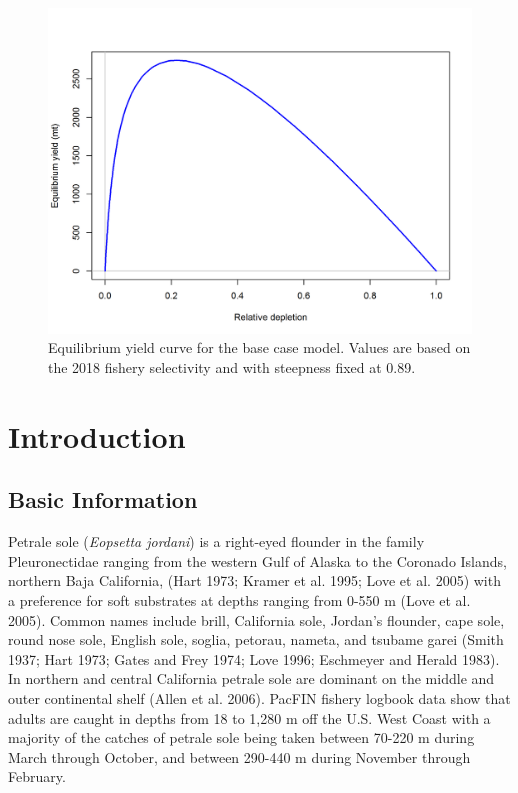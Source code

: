 \documentclass[12pt,]{article}
\begin{document}
\FloatBarrier

\begin{figure}
\centering
\includegraphics{r4ss/plots_mod1/yield1_yield_curve.png}
\caption{Equilibrium yield curve for the base case model. Values are
based on the 2018 fishery selectivity and with steepness fixed at 0.89.
\label{fig:Yield_all}}
\end{figure}

\FloatBarrier

\newpage

\renewcommand{\thefigure}{\arabic{figure}}
\renewcommand{\thetable}{\arabic{table}}

\setcounter{figure}{0} \setcounter{table}{0}


\section{Introduction}\label{introduction}

\subsection{Basic Information}\label{basic-information}

Petrale sole (\emph{Eopsetta jordani}) is a right-eyed flounder in the
family Pleuronectidae ranging from the western Gulf of Alaska to the
Coronado Islands, northern Baja California, (Hart 1973; Kramer et al.
1995; Love et al. 2005) with a preference for soft substrates at depths
ranging from 0-550 m (Love et al. 2005). Common names include brill,
California sole, Jordan's flounder, cape sole, round nose sole, English
sole, soglia, petorau, nameta, and tsubame garei (Smith 1937; Hart 1973;
Gates and Frey 1974; Love 1996; Eschmeyer and Herald 1983). In northern
and central California petrale sole are dominant on the middle and outer
continental shelf (Allen et al. 2006). PacFIN fishery logbook data show
that adults are caught in depths from 18 to 1,280 m off the U.S. West
Coast with a majority of the catches of petrale sole being taken between
70-220 m during March through October, and between 290-440 m during
November through February.
\end{document}
